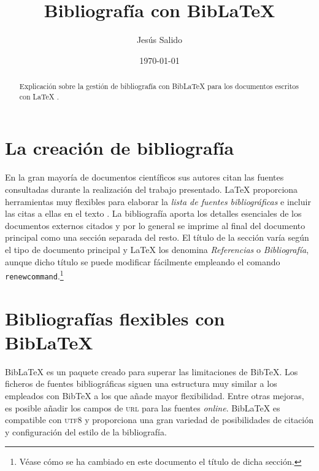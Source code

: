 \documentclass[11pt,a4paper]{article}
\author{Jesús Salido}
\title{Bibliografía con Bib\LaTeX{}}
\date{\today}
\begin{document}
\maketitle


\begin{abstract}
Explicación sobre la gestión de bibliografía con Bib\LaTeX{} para los documentos escritos con \LaTeX{} \cite{wikibookLaTex10}.
\end{abstract}

\tableofcontents

\section{La creación de bibliografía}
En la gran mayoría de documentos científicos \cite[ver][5]{salido15} sus autores citan las fuentes consultadas durante la realización del trabajo presentado. \LaTeX{} proporciona herramientas muy flexibles para elaborar la \emph{lista de fuentes bibliográficas} e incluir las citas a ellas en el texto \cite[ver][]{lamport94,cascales00,cascales03,goos04,kopka04}. La bibliografía aporta los detalles esenciales de los documentos externos citados y por lo general se imprime al final del documento principal como una sección separada del resto. El título de la sección varía según el tipo de documento principal y \LaTeX{} los denomina \emph{Referencias} o \emph{Bibliografía}, aunque dicho título se puede modificar fácilmente empleando el comando \texttt{renewcommand}.\footnote{Véase cómo se ha cambiado en este documento el título de dicha sección.}


\section{Bibliografías flexibles con Bib\LaTeX}
Bib\LaTeX{} es un paquete creado para superar las limitaciones de Bib\TeX. Los ficheros de fuentes bibliográficas siguen una estructura muy similar a los empleados con Bib\TeX{} a los que añade mayor flexibilidad. Entre otras mejoras, es posible añadir los campos de \textsc{url} para las fuentes \emph{online}. Bib\LaTeX{} es compatible con \textsc{utf8} y proporciona una gran variedad de posibilidades de citación y configuración del estilo de la bibliografía. 



\nocite{*} %

\printbibliography[heading=bibintoc,title=Bibliografía]
\end{document}
